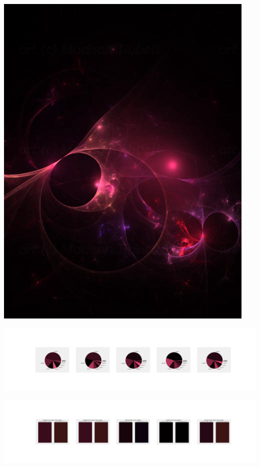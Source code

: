 \documentclass[11pt]{article}
\begin{document}
\begin{landscape}
    \begin{center}
    \includegraphics[width=\textwidth]{./nbimg/file (11).jpg}
    \end{center}

    \begin{center}
    \includegraphics[width=250mm]{./nbimg/pie-12.jpg}
    \end{center}

    \begin{center}
    \includegraphics[width=250mm]{./nbimg/peak-12.jpg}
    \end{center}
    


\end{landscape}
\end{document}
